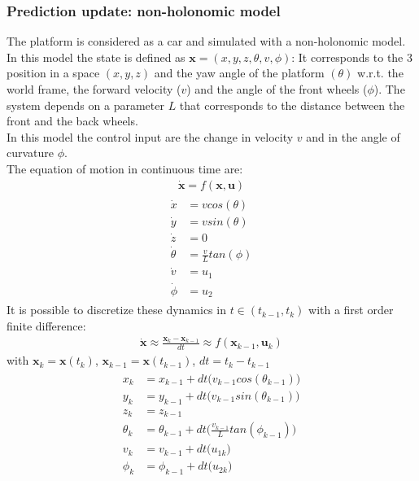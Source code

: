 \subsubsection{Prediction update: non-holonomic model}
The platform is considered as a car and simulated with a non-holonomic model. 
In this model the state is defined as $\boldsymbol{x} = (x, y, z,\theta , v, \phi)$:
It corresponds to the 3 position in a space $(x,y,z)$ and the yaw angle of the platform $(\theta)$ w.r.t. the world frame, the forward velocity ($v$) and the angle of the front wheels ($\phi$). The system depends on a parameter $L$ that corresponds to the distance between the front and the back wheels.\\
In this model the control input are the change in velocity $v$ and in the angle of curvature $\phi$. \\
The equation of motion in continuous time are:
\begin{align}
\boldsymbol{\dot{x}} = f(\boldsymbol{x},\boldsymbol{u}) \nonumber
\end{align}
\begin{align}
\begin{split}
\dot{x} &= v cos(\theta) \\
\dot{y} &= v sin(\theta) \\
\dot{z} &= 0 \\
\dot{\theta} &= \frac{v}{L}tan(\phi)\\
\dot{v} &= u_1 \\
\dot{\phi} &= u_2 
\end{split}
\end{align}
It is possible to discretize these dynamics in $t \in (t_{k-1}, t_k)$ with a first order finite difference:
\begin{align}
\boldsymbol{\dot{x}} \approx \frac{\boldsymbol{x}_k - \boldsymbol{x}_{k-1} }{dt} \approx f(\boldsymbol{x}_{k-1},\boldsymbol{u}_k) \nonumber
\end{align}
with $\boldsymbol{x}_k = \boldsymbol{x}(t_k)$, $\boldsymbol{x}_{k-1} = \boldsymbol{x}(t_{k-1})$, $dt = t_k - t_{k-1}$
\begin{align}
\begin{split}
x_k &= x_{k-1} + dt \big(v_{k-1} cos(\theta_{k-1})\big) \\
y_k &= y_{k-1} + dt \big(v_{k-1} sin(\theta_{k-1})\big) \\
z_k &= z_{k-1} \\
\theta_k &= \theta_{k-1} + dt\Big(\frac{v_{k-1}}{L}tan(\phi_{k-1}) \Big)\\
v_{k} &= v_{k-1} + dt \big(u_{1k}\big) \\
\phi_k &= \phi_{k-1} + dt \big(u_{2k}\big) 
\end{split}
\end{align}
